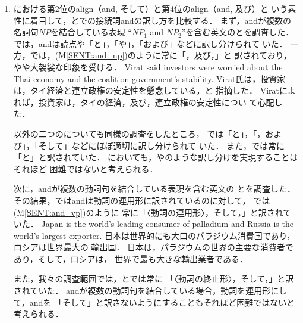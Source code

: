\documentclass[japanese]{jnlp_1.4}
\newcommand{\HUM}{}
\newcommand{\MT}{}
\newcommand{\MTS}{}
\newcommand{\MTF}{}
\newcommand{\MTL}{}
\newenvironment{SENT2}{}{}
\begin{document}
\begin{enumerate}
\item
{\MTS}における第2位のalign（and, そして）と第4位のalign（and, 及び）と
いう素性に着目して，{\MTS}と{\HUM}での接続詞andの訳し方を比較する．
まず，andが複数の名詞句$NP$を結合している表現
``$NP_1$ and $NP_2$''を含む英文の{\HUM}と{\MTS}を調査した．
{\HUM}では，andは読点や「と」，「や」，「および」などに訳し分けられて
いた．
一方，{\MTS}では，(M\ref{SENT:and_np})のように常に「，及び，」と
訳されており，やや大袈裟な印象を受ける．
\begin{SENT2}
\sentE Virat said investors were worried about the Thai economy and the 
coalition government's stability.
\sentH Virat氏は，投資家は，タイ経済と連立政権の安定性を懸念している，と
指摘した．
\sentM Viratによれば，投資家は，タイの経済，及び，連立政権の安定性につい
て心配した．
\label{SENT:and_np}
\end{SENT2}

{\MTS}以外の二つの{\MT}についても同様の調査をしたところ，
{\MTF}では「と」，「，および」，「そして」などにほぼ適切に訳し分けられて
いた．
また，{\MTL}では常に「と」と訳されていた．
{\MTS}においても，{\MTF}や{\MTL}のような訳し分けを実現することはそれほど
困難ではないと考えられる．

次に，andが複数の動詞句を結合している表現を含む英文の
{\HUM}と{\MTS}を調査した．
その結果，{\HUM}ではandは動詞の連用形に訳されているのに対して，
{\MTS}では(M\ref{SENT:and_vp})のように
常に「〈動詞の連用形〉，そして，」と訳されていた．
\begin{SENT2}
\sentE Japan is the world's leading consumer of palladium and Russia is 
the world's largest exporter.
\sentH 日本は世界的にも大口のパラジウム消費国であり，ロシアは世界最大の
輸出国．
\sentM 日本は，パラジウムの世界の主要な消費者であり，そして，ロシアは，
世界で最も大きな輸出業者である．
\label{SENT:and_vp}
\end{SENT2}

また，我々の調査範囲では，{\MTF}と{\MTL}では常に
「〈動詞の終止形〉，そして，」と訳されていた．
andが複数の動詞句を結合している場合，動詞を連用形にして，andを
「そして」と訳さないようにすることもそれほど困難ではないと考えられる．


\end{enumerate}
\end{document}
